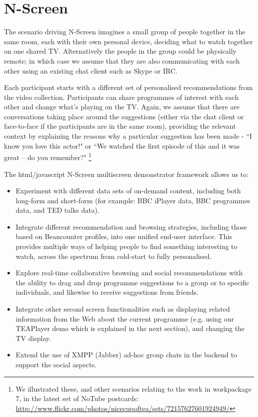 \documentclass{notube}
\begin{document}
\chapter{N-Screen}

The scenario driving N-Screen imagines a small group of people together in the same room, each with their own personal device, deciding what to watch together on one shared TV. Alternatively the people in the group could be physically remote; in which case we assume that they are also communicating with each other using an existing chat client such as Skype or IRC.

Each participant starts with a different set of personalised recommendations from the video collection. Participants can share programmes of interest with each other and change what’s playing on the TV. Again, we assume that there are conversations taking place around the suggestions (either via the chat client or face-to-face if the participants are in the same room), providing the relevant context by explaining the reasons why a particular suggestion has been made  - ``I know you love this actor!" or ``We watched the first episode of this and it was great – do you remember?"
\footnote{We illustrated these, and other scenarios relating to the work in workpackage 7, in the latest set of NoTube postcards: \url{http://www.flickr.com/photos/nicecupoftea/sets/72157627601924949/}}

The html/javascript N-Screen multiscreen demonstrator framework allows us to:

\begin{itemize}
\item{Experiment with different data sets of on-demand content, including both long-form and short-form (for example: BBC iPlayer data, BBC programmes data, and TED talks data).}
\item{Integrate different recommendation and browsing strategies, including those based on Beancounter profiles, into one unified end-user interface. This provides multiple ways of helping people to find something interesting to watch, across the spectrum from cold-start to fully personalised.}
\item{Explore real-time collaborative browsing and social recommendations with the ability to drag and drop programme suggestions to a group or to specific individuals, and likewise to receive suggestions from friends.}
\item{Integrate other second screen functionalities such as displaying related information from the Web about the current programme (e.g. using our TEAPlayer demo which is explained in the next section), and changing the TV display.}
\item{Extend the use of XMPP (Jabber) ad-hoc group chats in the backend to support the social aspects.}
\end{itemize}
\end{document}
